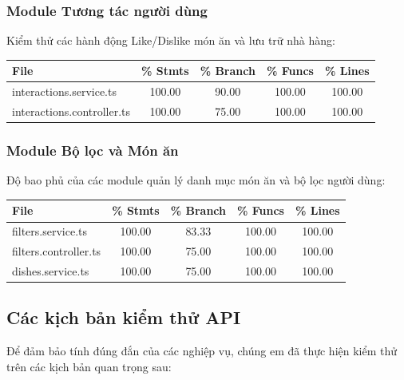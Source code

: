 \subsubsection{Module Tương tác người dùng}
Kiểm thử các hành động Like/Dislike món ăn và lưu trữ nhà hàng:
\begin{table}[H]
\centering
\begin{tabular}{|l|c|c|c|c|}
\hline
\textbf{File} & \textbf{\% Stmts} & \textbf{\% Branch} & \textbf{\% Funcs} & \textbf{\% Lines} \\ \hline
interactions.service.ts & 100.00 & 90.00 & 100.00 & 100.00 \\ \hline
interactions.controller.ts & 100.00 & 75.00 & 100.00 & 100.00 \\ \hline
\end{tabular}
\end{table}

\subsubsection{Module Bộ lọc và Món ăn}
Độ bao phủ của các module quản lý danh mục món ăn và bộ lọc người dùng:
\begin{table}[H]
\centering
\begin{tabular}{|l|c|c|c|c|}
\hline
\textbf{File} & \textbf{\% Stmts} & \textbf{\% Branch} & \textbf{\% Funcs} & \textbf{\% Lines} \\ \hline
filters.service.ts & 100.00 & 83.33 & 100.00 & 100.00 \\ \hline
filters.controller.ts & 100.00 & 75.00 & 100.00 & 100.00 \\ \hline
dishes.service.ts & 100.00 & 75.00 & 100.00 & 100.00 \\ \hline
\end{tabular}
\end{table}



\subsection{Các kịch bản kiểm thử API}
Để đảm bảo tính đúng đắn của các nghiệp vụ, chúng em đã thực hiện kiểm thử trên các kịch bản quan trọng sau:


